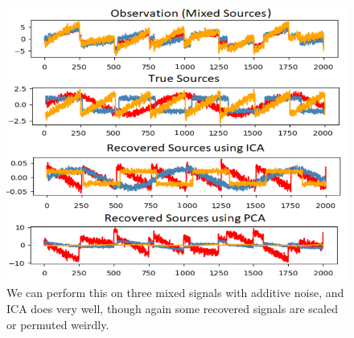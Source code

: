   \begin{figure}[H]
    \centering 
    \includegraphics[scale=0.4]{img/ICA_example.png}
    \caption{We can perform this on three mixed signals with additive noise, and ICA does very well, though again some recovered signals are scaled or permuted weirdly. }
    \label{fig:}
  \end{figure}

